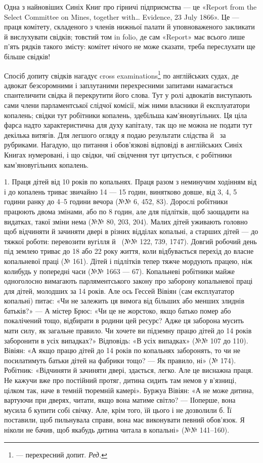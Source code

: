 Одна з найновіших Синіх Книг про гірничі підприємства —
це «Report from the Select Committee on Mines, together with\dots{}
Evidence, 23 July 1866». Це — праця комітету, складеного з
членів нижньої палати й уповноваженого закликати й вислухувати
свідків; товстий том in folio, де сам «Report» має всього
лише п’ять рядків такого змісту: комітет нічого не може сказати,
треба переслухати ще більше свідків!

Спосіб допиту свідків нагадує cross examinations\footnote*{
— перехресний допит. \emph{Ред.}
} по англійських
судах, де адвокат безсоромними і заплутаними перехресними
запитами намагається спантеличити свідка й перекрутити
його слова. Тут у ролі адвокатів виступають сами члени парламентської
слідчої комісії, між ними власники й експлуататори копалень;
свідки тут робітники копалень, здебільша кам’яновугільних.
Ця ціла фарса надто характеристична для духу капіталу, так що
не можна не подати тут декілька витягів. Для легшого огляду
я подаю результати слідства й~ за рубриками. Нагадую, що
питання і обов’язкові відповіді в англійських Синіх Книгах
нумеровані, і що свідки, чиї свідчення тут цитується, є робітники
кам’яновугільних копалень.

1. Праця дітей від 10 років по копальнях. Праця разом з
неминучим ходінням від і до копалень триває звичайно 14 —
15 годин, винятково довше, від 3, 4, 5 години ранку до 4--5 години
вечора (№№ 6, 452, 83). Дорослі робітники працюють двома
змінами, або по 8 годин, але для підлітків, щоб заощадити на
видатках, такої зміни нема (№№ 80, 203, 204). Малих дітей уживають
головно щоб відчиняти й зачиняти двері в різних відділах
копальні, а старших дітей — до тяжкої роботи: перевозити вугілля
й~ (№№ 122, 739, 1747). Довгий робочий день під землею
триває до 18 або 22 року життя, коли відбувається перехід до
власне копальневої праці (№ 161). Дітей і підлітків тепер тяжче
мордують працею, ніж колибудь у попередні часи (№№ 1663 —
67). Копальневі робітники майже одноголосно вимагають парляментського
закону про заборону копальневої праці для дітей,
молодших за 14 років. Але ось Гессей Вівіян (сам експлуататор
копальні) питає: «Чи не залежить ця вимога від більших або
менших злиднів батьків?» — А містер Брюс: «Чи це не жорстоко,
якщо батько помер або покалічений тощо, відбирати в родини
цей ресурс? Адже ця заборона мусить мати силу, як загальне
правило. Чи хочете ви підземну працю дітей до 14 років заборонити
в усіх випадках?» Відповідь: «В усіх випадках» (№№ 107
до 110). Вівіян: «А якщо працю дітей до 14 років по копальнях
заборонять, то чи не посилатимуть батьки дітей на фабрики
тощо? — Як правило, ні» (№ 174). Робітник: «Відчиняти й зачиняти
двері, здається, легко. Але це виснажна праця. Не кажучи
вже про постійний протяг, дитина сидить там немов у в’язниці,
цілком так, наче в темній тюремній камері». Буржуа Вівіян:
«А не може дитина, вартуючи при дверях, читати, якщо вона
матиме світло? — ІІоперше, вона мусила б купити собі свічку.
Але, крім того, їй цього і не дозволили б. Її поставили, щоб пильнувала
справи, вона має виконувати певний обов’язок. Я ніколи
не бачив, щоб якабудь дитина читала в копальні» (№№ 141--160).

